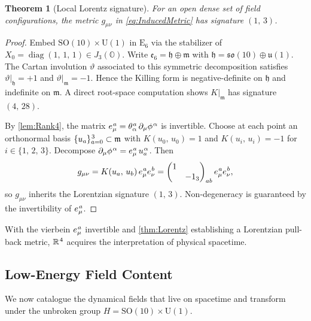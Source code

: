 \documentclass[pdflatex,sn-mathphys-num]{sn-jnl}
\theoremstyle{thmstyleone}
\newtheorem{theorem}{Theorem}
\theoremstyle{thmstyletwo}%
\theoremstyle{thmstylethree}%
\newcommand{\SO}[1]{\mathrm{SO(#1)}}
\newcommand{\U}[1]{\mathrm{U(#1)}}
\newcommand{\E}[1]{\mathrm{E_{#1}}}
\newcommand{\Oct}{\mathbb{O}}
\newcommand{\SOTen}{\SO{10}}
\newcommand{\UOne}{\U{1}}
\newcommand{\ESix}{\E{6}}
\newcommand{\SOTenXUOne}{\SOTen \times \UOne}
\newcommand{\sm}{\hspace{.065em}}
\newcommand{\smexp}[1]{^{\sm #1}}
\begin{document}
\begin{theorem}[Local Lorentz signature]\label{thm:Lorentz}
For an open dense set of field configurations, the metric
$g_{\mu\nu}$ in \eqref{eq:InducedMetric} has signature $(1,\,3)$.
\end{theorem}

\begin{proof}
Embed \(\SOTenXUOne\) in \(\ESix\) via the stabilizer of
\(X_{0}=\operatorname{diag}(1,\,1,\,1)\in J_{3}(\Oct)\).
Write \(\mathfrak e_{6}=\mathfrak h\oplus\mathfrak m\) with
\(\mathfrak h=\mathfrak{so}(10)\oplus\mathfrak u(1)\).
The Cartan involution $\vartheta$ associated to this symmetric
decomposition satisfies \(\vartheta|_{\mathfrak h}=+1\) and
\(\vartheta|_{\mathfrak m}=-1\). Hence the Killing form is negative-definite
on $\mathfrak h$ and indefinite on \(\mathfrak m\).
A direct root-space computation \cite{Helgason:1978} shows \(K|_{\mathfrak m}\)
has signature \((4,\,28)\).

By \autoref{lem:Rank4}, the matrix
\(e_\mu\smexp{ a}=\theta\smexp{a}_{\alpha}\,\partial_\mu\phi\smexp{\alpha}\)
is invertible.  Choose at each point an orthonormal basis
\(\{u_{a}\}_{a=0}\smexp{3}\subset\mathfrak m\) with
\(K(u_{0},\, u_{0})=1\) and \(K(u_{i},\,u_{i})=-1\) for \(i\in\{1,\,2,\,3\}\).
Decompose \(\partial_\mu\phi\smexp{\alpha}=e_\mu\smexp{ a}\,u_{a}\smexp{ \alpha}\).
Then
\[
  g_{\mu\nu}
  =K(u_{a},\,u_{b})\,e_\mu\smexp{ a}e_\nu\smexp{ b}
  =\begin{pmatrix}
     1& \\ &-1_{3}
   \end{pmatrix}_{ab}
   e_\mu\smexp{ a}e_\nu\smexp{ b},
\]
so \(g_{\mu\nu}\) inherits the Lorentzian signature \((1,\,3)\).
Non-degeneracy is guaranteed by the invertibility of \(e_\mu\smexp{a}\).
\end{proof}

With the vierbein $e_{\mu}\smexp{a}$ invertible and
\autoref{thm:Lorentz} establishing a Lorentzian pull-back metric,
$\mathbb R\smexp{4}$ acquires the interpretation of physical spacetime.


\subsection{Low-Energy Field Content}
\label{subsec:FieldContent}

We now catalogue the dynamical fields that live on spacetime and transform under
the unbroken group
\(
  H=\SOTenXUOne
\).
\end{document}
